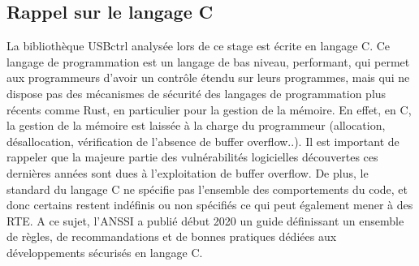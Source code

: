 \subsection{Rappel sur le langage C}
La bibliothèque USBctrl analysée lors de ce stage est écrite en langage C. Ce langage de programmation est un langage de bas niveau, performant, qui permet aux programmeurs d'avoir un contrôle étendu sur leurs programmes, mais qui ne dispose pas des mécanismes de sécurité des langages de programmation plus récents comme Rust, en particulier pour la gestion de la mémoire. En effet, en C, la gestion de la mémoire est laissée à la charge du programmeur (allocation, désallocation, vérification de l'absence de buffer overflow..). Il est important de rappeler que la majeure partie des vulnérabilités logicielles découvertes ces dernières années sont dues à l'exploitation de buffer overflow.
\newline \noindent De plus, le standard du langage C ne spécifie pas l'ensemble des comportements du code, et donc certains restent indéfinis ou non spécifiés ce qui peut également mener à des RTE. A ce sujet, l'ANSSI a publié début 2020 un guide définissant un ensemble de règles, de recommandations et de bonnes pratiques dédiées aux développements sécurisés en langage C.






